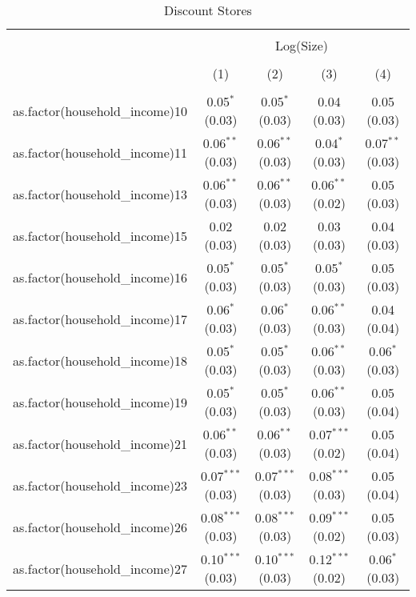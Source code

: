 
\begin{table}[!htbp] \centering 
  \caption{Discount Stores} 
  \label{tab:packageSizeDiscountTamponLiqAppendix} 
\begin{tabular}{@{\extracolsep{5pt}}lcccc} 
\\[-1.8ex]\hline 
\hline \\[-1.8ex] 
 & \multicolumn{4}{c}{Log(Size)} \\ 
\\[-1.8ex] & (1) & (2) & (3) & (4)\\ 
\hline \\[-1.8ex] 
 as.factor(household\_income)10 & 0.05$^{*}$ (0.03) & 0.05$^{*}$ (0.03) & 0.04 (0.03) & 0.05 (0.03) \\ 
  as.factor(household\_income)11 & 0.06$^{**}$ (0.03) & 0.06$^{**}$ (0.03) & 0.04$^{*}$ (0.03) & 0.07$^{**}$ (0.03) \\ 
  as.factor(household\_income)13 & 0.06$^{**}$ (0.03) & 0.06$^{**}$ (0.03) & 0.06$^{**}$ (0.02) & 0.05 (0.03) \\ 
  as.factor(household\_income)15 & 0.02 (0.03) & 0.02 (0.03) & 0.03 (0.03) & 0.04 (0.03) \\ 
  as.factor(household\_income)16 & 0.05$^{*}$ (0.03) & 0.05$^{*}$ (0.03) & 0.05$^{*}$ (0.03) & 0.05 (0.03) \\ 
  as.factor(household\_income)17 & 0.06$^{*}$ (0.03) & 0.06$^{*}$ (0.03) & 0.06$^{**}$ (0.03) & 0.04 (0.04) \\ 
  as.factor(household\_income)18 & 0.05$^{*}$ (0.03) & 0.05$^{*}$ (0.03) & 0.06$^{**}$ (0.03) & 0.06$^{*}$ (0.03) \\ 
  as.factor(household\_income)19 & 0.05$^{*}$ (0.03) & 0.05$^{*}$ (0.03) & 0.06$^{**}$ (0.03) & 0.05 (0.04) \\ 
  as.factor(household\_income)21 & 0.06$^{**}$ (0.03) & 0.06$^{**}$ (0.03) & 0.07$^{***}$ (0.02) & 0.05 (0.04) \\ 
  as.factor(household\_income)23 & 0.07$^{***}$ (0.03) & 0.07$^{***}$ (0.03) & 0.08$^{***}$ (0.03) & 0.05 (0.04) \\ 
  as.factor(household\_income)26 & 0.08$^{***}$ (0.03) & 0.08$^{***}$ (0.03) & 0.09$^{***}$ (0.02) & 0.05 (0.03) \\ 
  as.factor(household\_income)27 & 0.10$^{***}$ (0.03) & 0.10$^{***}$ (0.03) & 0.12$^{***}$ (0.02) & 0.06$^{*}$ (0.03) \\ 

\end{tabular}
\end{table}
